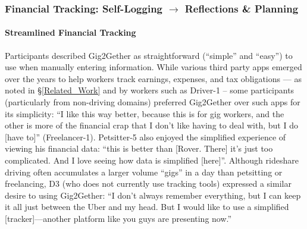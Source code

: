 \noindent

\subsubsection{ {Financial} Tracking{: Self-Logging $\rightarrow$ Reflections \& Planning}}
\paragraph{\textbf{Streamlined Financial Tracking}} Participants described Gig2Gether as straightforward (``simple'' and ``easy'') to use when manually entering information. 
While various third party apps emerged over the years to help workers track earnings, expenses, and tax obligations --- as noted in \S\ref{Related_Work} and by workers such as Driver-1 -- some participants (particularly from {non-driving domains}) preferred Gig2Gether over such apps for its simplicity: ``I like this way better, because this is for gig workers, and the other is more of the financial crap that I don't like having to deal with, but I do [have to]'' (Freelancer-1). Petsitter-5 also enjoyed the simplified experience of viewing his financial data: ``this is better than [Rover. There] it's just too complicated. And I love seeing how data is simplified [here]''.
Although rideshare driving often accumulates a larger volume ``gigs'' in a day than petsitting or freelancing, D3 (who does not currently use tracking tools) expressed a similar desire to using Gig2Gether: ``I don't always remember everything, but I can keep it all just between the Uber and my head. But I would like to use a simplified [tracker]---another platform like you guys are presenting now.'' 


